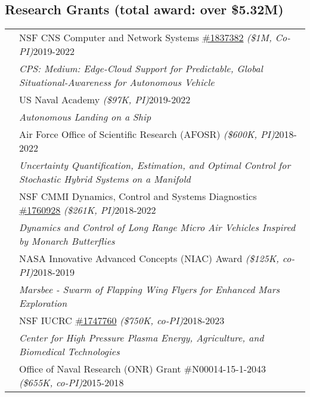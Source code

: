 \documentclass[10pt]{article}
\begin{document}
\subsection*{Research Grants \textnormal{\normalsize (total award: over \$5.32M)}}
\setlength{\tabcolsep}{0cm}
\begin{tabularx}{\textwidth}{>{\setlength{\hsize}{0.5cm}}X X}%
& NSF CNS Computer and Network Systems \href{http://www.nsf.gov/awardsearch/showAward?AWD_ID=1837382}{\#1837382} \textit{(\$1M, Co-PI)}\hfill 2019-2022  \\
& \quad\textit{CPS: Medium: Edge-Cloud Support for Predictable, Global Situational-Awareness for Autonomous Vehicle} \vspace*{0.08cm}\\
%
& US Naval Academy \textit{(\$97K, PI)}\hfill 2019-2022  \\
& \quad\textit{Autonomous Landing on a Ship} \vspace*{0.08cm}\\
%
    & Air Force Office of Scientific Research (AFOSR)  \textit{(\$600K, PI)}\hfill 2018-2022  \\
& \quad\textit{Uncertainty Quantification, Estimation, and Optimal Control for Stochastic Hybrid Systems on a Manifold} \vspace*{0.08cm}\\
%
& NSF CMMI Dynamics, Control and Systems Diagnostics \href{http://www.nsf.gov/awardsearch/showAward?AWD_ID=1760927}{\#1760928} \textit{(\$261K, PI)}\hfill 2018-2022  \\
& \quad\textit{Dynamics and Control of Long Range Micro Air Vehicles Inspired by Monarch Butterflies} \vspace*{0.08cm}\\
%
& NASA Innovative Advanced Concepts (NIAC) Award \textit{(\$125K, co-PI)}\hfill 2018-2019 \\
& \quad\textit{Marsbee - Swarm of Flapping Wing Flyers for Enhanced Mars Exploration} \vspace*{0.08cm}\\
%
& NSF IUCRC \href{https://www.nsf.gov/awardsearch/showAward?AWD_ID=1747760}{\#1747760} \textit{(\$750K, co-PI)}\hfill 2018-2023 \\
& \quad\textit{Center for High Pressure Plasma Energy, Agriculture, and Biomedical Technologies} \vspace*{0.08cm}\\
%     
& Office of Naval Research (ONR) Grant \#N00014-15-1-2043 \textit{(\$655K, co-PI)}\hfill 2015-2018 \\

\end{tabularx}
\end{document}
